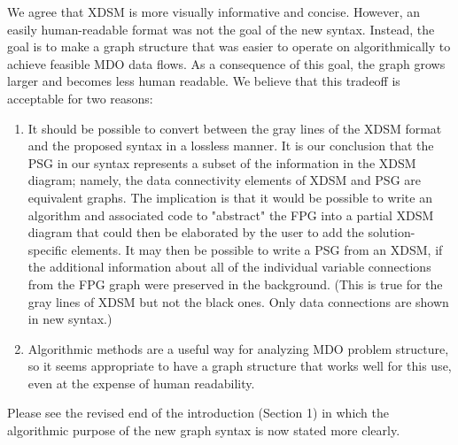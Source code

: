\documentclass{aiaa-tc}
\begin{document}

We agree that XDSM is more visually informative and concise. However, an easily human-readable format was not the 
goal of the new syntax. Instead, the goal is to make a graph structure that 
was easier to operate on algorithmically to achieve feasible MDO data flows. As a consequence of this goal, the graph grows larger and becomes
less human readable. We believe that this tradeoff is acceptable for two reasons: 

\begin{enumerate}
    \item It should be possible to convert between the gray lines of the XDSM format and the proposed syntax 
    in a lossless manner. 
    It is our conclusion that the PSG in our syntax represents a subset of the information in the XDSM diagram; namely, the data connectivity elements of XDSM and PSG are equivalent graphs.  The implication is that it would be possible to write an algorithm and associated code to "abstract" the FPG into a partial XDSM diagram that could then be elaborated by the user to add the solution-specific elements.  It may then be possible to write a PSG from an XDSM, if the additional information about all of the individual variable connections from the FPG graph were preserved in the background.
    (This is true for the gray lines of XDSM but not the black ones.
    Only data connections are shown in new syntax.) 
    \item Algorithmic methods are a useful way for analyzing MDO problem structure, so it seems appropriate to have a graph structure that works well for this use, even at the expense 
    of human readability. 
\end{enumerate}

Please see the revised end of the introduction (Section 1) in which the algorithmic purpose of the new graph syntax is now stated more clearly. 

\end{document}
